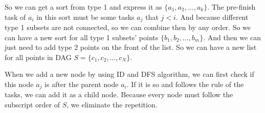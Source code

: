 \documentclass[11pt]{article}
\begin{document}
So we can get a sort from type 1 and express it as $ \lbrace a_1,a_2,\dots,a_k \rbrace $. The pre-finish task of $ a_i $ in this sort must be some tasks $ a_j $ that $ j<i $. And because different type 1 subsets are not connected, so we can combine then by any order. So we can have a new sort for all type 1 subsets' points $ \lbrace b_1,b_2,\dots,b_m \rbrace $. And then we can just need to add type 2 points on the front of the list. So we can have a new list for all points in DAG $ S = \lbrace c_1, c_2,\dots, c_N\rbrace $.

When we add a new node by using ID and DFS algorithm, we can first check if this node $ a_j $ is after the parent node $ a_i $. If it is so and follows the rule of the tasks, we can add it as a child node. Because every node must follow the subscript order of $ S $, we eliminate the repetition.
\end{document}

